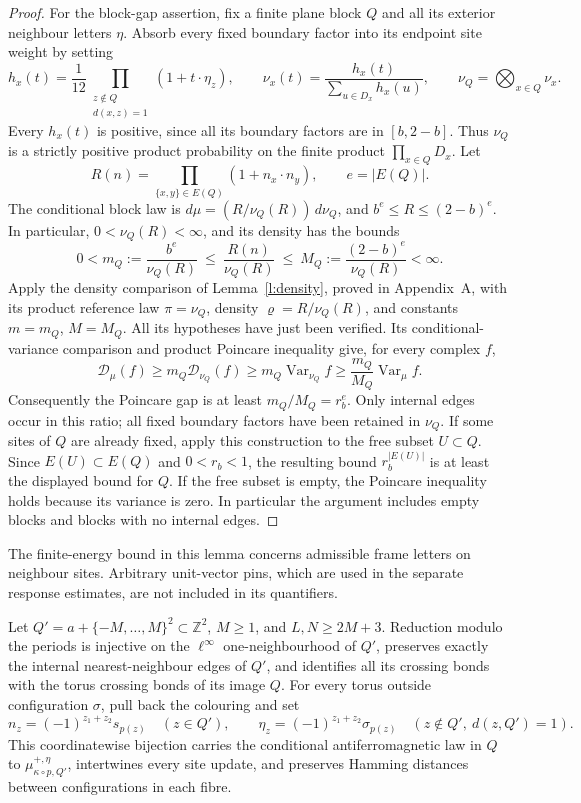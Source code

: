 \begin{proof}
For the block-gap assertion, fix a finite plane block \(Q\) and
all its exterior neighbour letters \(\eta\). Absorb every fixed
boundary factor into its endpoint site weight by setting
\[
 h_x(t)=\frac1{12}
       \prod_{\substack{z\notin Q\\d(x,z)=1}}
                    (1+t\cdot\eta_z),\qquad
 \nu_x(t)=\frac{h_x(t)}{\sum_{u\in D_x}h_x(u)},\qquad
 \nu_Q=\bigotimes_{x\in Q}\nu_x.
\]
Every \(h_x(t)\) is positive, since all its boundary factors are
in \([b,2-b]\). Thus \(\nu_Q\) is a strictly positive product
probability on the finite product \(\prod_{x\in Q}D_x\). Let
\[
 R(n)=\prod_{\{x,y\}\in E(Q)}(1+n_x\cdot n_y),\qquad
 e=|E(Q)|.
\]
The conditional block law is \(d\mu=(R/\nu_Q(R))\,d\nu_Q\),
and \(b^e\le R\le(2-b)^e\). In particular,
\(0<\nu_Q(R)<\infty\), and its density has the bounds
\[
 0<m_Q:=\frac{b^e}{\nu_Q(R)}
 \ \le\ \frac{R(n)}{\nu_Q(R)}
 \ \le\ M_Q:=\frac{(2-b)^e}{\nu_Q(R)}<\infty.
\]
Apply the density comparison of Lemma~\ref{l:density}, proved in
Appendix~A, with its product reference law \(\pi=\nu_Q\),
density \(\varrho=R/\nu_Q(R)\), and constants \(m=m_Q\),
\(M=M_Q\). All its hypotheses have just been verified. Its
conditional-variance comparison and product Poincare inequality give,
for every complex \(f\),
\[
 \mathcal D_\mu(f)
 \ge m_Q\mathcal D_{\nu_Q}(f)
 \ge m_Q\operatorname{Var}_{\nu_Q}f
 \ge\frac{m_Q}{M_Q}\operatorname{Var}_\mu f.
\]
Consequently the Poincare gap is at least
\(m_Q/M_Q=r_b^e\). Only internal edges occur in this ratio;
all fixed boundary factors have been retained in \(\nu_Q\).
If some sites of \(Q\) are already fixed, apply this construction
to the free subset \(U\subset Q\). Since
\(E(U)\subset E(Q)\) and \(0<r_b<1\), the resulting bound
\(r_b^{|E(U)|}\) is at least the displayed bound for \(Q\).
If the free subset is empty, the Poincare inequality holds because
its variance is zero. In particular the argument includes empty
blocks and blocks with no internal edges.
\end{proof}

The finite-energy bound in this lemma concerns admissible frame
letters on neighbour sites. Arbitrary unit-vector pins, which are
used in the separate response estimates, are not included in its
quantifiers.

\begin{lemma}\label{l:boxlift}
Let \(Q'=a+\{-M,\ldots,M\}^2\subset\mathbb Z^2\), \(M\ge1\),
and \(L,N\ge2M+3\). Reduction modulo the periods is injective
on the \(\ell^\infty\) one-neighbourhood of \(Q'\), preserves exactly
the internal nearest-neighbour edges of \(Q'\), and identifies all its
crossing bonds with the torus crossing bonds of its image \(Q\).
For every torus outside configuration \(\sigma\), pull back the
colouring and set
\[
 n_z=(-1)^{z_1+z_2}s_{p(z)}\quad(z\in Q'),\qquad
 \eta_z=(-1)^{z_1+z_2}\sigma_{p(z)}
       \quad(z\notin Q',\ d(z,Q')=1).
\]
This coordinatewise bijection carries the conditional
antiferromagnetic law in \(Q\) to
\(\mu^{+,\eta}_{\kappa\circ p,Q'}\), intertwines every site update,
and preserves Hamming distances between configurations in each fibre.
\end{lemma}


